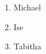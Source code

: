 \documentclass{article}
\begin{document}
	\begin{enumerate}
		\item Michael 
		\item Ise
		\item Tabitha
	\end{enumerate}
\end{document}

